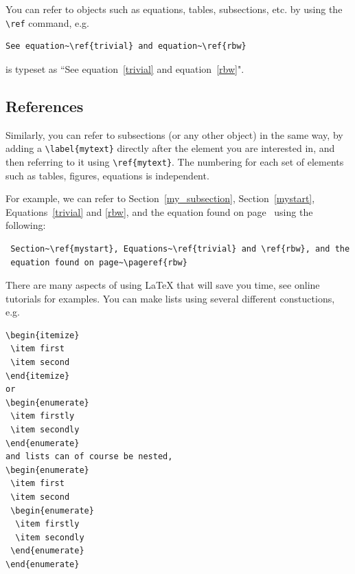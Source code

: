 \documentclass[a4paper,12pt]{article}
\begin{document}
You can refer to objects such as equations, tables, subsections,
etc. by using the \verb+\ref+ command, e.g.
\begin{verbatim}
See equation~\ref{trivial} and equation~\ref{rbw}
\end{verbatim}
 is typeset as ``See equation~\ref{trivial} and equation~\ref{rbw}".

\subsection{References}
 Similarly, you can refer to subsections (or any other object) in
 the same way, by adding a \verb+\label{mytext}+ directly after
 the element you are interested in, and then referring to it
 using \verb+\ref{mytext}+.  The numbering for each set of
 elements such as tables, figures, equations is independent.

 For example, we can refer to Section~\ref{my_subsection},
 Section~\ref{mystart}, Equations~\ref{trivial} and \ref{rbw}, and the
 equation found on page~\pageref{rbw} using the following:

\begin{verbatim}
 Section~\ref{mystart}, Equations~\ref{trivial} and \ref{rbw}, and the
 equation found on page~\pageref{rbw}
\end{verbatim}

There are many aspects of using LaTeX that will save you time, see online tutorials for examples.
You can make lists using several different constuctions, e.g.
\begin{verbatim}
\begin{itemize}
 \item first
 \item second
\end{itemize}
or 
\begin{enumerate}
 \item firstly
 \item secondly
\end{enumerate}
and lists can of course be nested, 
\begin{enumerate}
 \item first
 \item second
 \begin{enumerate}
  \item firstly
  \item secondly
 \end{enumerate}
\end{enumerate}
\end{verbatim}
\end{document}
